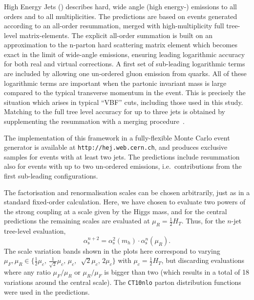 \subsubsection{\Hej}
\label{sec:hjetscomp:tools:bfkl:hej}

High Energy Jets (\Hej) describes hard, wide angle (high energy-)
emissions to all orders and to all multiplicities. The predictions are based
on events generated according to an all-order resummation, merged with
high-multiplicity full tree-level matrix-elements. The explicit all-order summation
is built on an approximation to the n-parton hard scattering matrix element
\cite{Andersen:2009nu,Andersen:2009he,Andersen:2011hs} which becomes exact in
the limit of wide-angle emissions, ensuring leading logarithmic accuracy for
both real and virtual corrections. A first set of sub-leading logarithmic
terms are included by allowing one un-ordered gluon emission from quarks. All
of these logarithmic terms are important when
the partonic invariant mass is large compared to the typical transverse
momentum in the event. This is precisely the situation which arises in
typical ``VBF'' cuts, including those used in this study.  Matching to the
full tree level accuracy for up to three jets is obtained by supplementing
the resummation with a merging
procedure~\cite{Andersen:2008ue,Andersen:2008gc}.

The implementation of this framework in a fully-flexible Monte Carlo event
generator is available at \texttt{http://hej.web.cern.ch}, and produces
exclusive samples for events with at least two jets.  The predictions include
resummation also for events with up to two un-ordered emissions,
i.e.~contributions from the first sub-leading configurations.

The factorisation and renormalisation scales can be chosen arbitrarily, just
as in a standard fixed-order calculation. Here, we have chosen to evaluate
two powers of the strong coupling at a scale given by the Higgs mass, and for
the central predictions the remaining scales are evaluated at $\mu_R=\tfrac{1}{2}H_T$. Thus,
for the $n$-jet tree-level evaluation, 
\begin{equation}
  \alpha_\mathrm{s}^{n+2}=\alpha_\mathrm{s}^2(m_h)\cdot \alpha_\mathrm{s}^n(\mu_R).
\end{equation}
The scale variation bands shown in the plots here correspond to varying
$\mu_F,\mu_R\in \{\tfrac{1}{2}\mu_c,\,\tfrac{1}{\sqrt{2}}\mu_c,\,\mu_c,$ $\,\sqrt{2}\mu_c,\,2\mu_c\}$ with 
$\mu_c=\tfrac{1}{2}H_T$, but discarding evaluations where any ratio $\mu_F/\mu_R$ or 
$\mu_R/\mu_F$ is bigger than two (which results in a total of 18 variations
around the central scale). The \texttt{CT10nlo} \cite{Lai:2010vv,Gao:2013xoa} parton 
distribution functions were used in the predictions.
